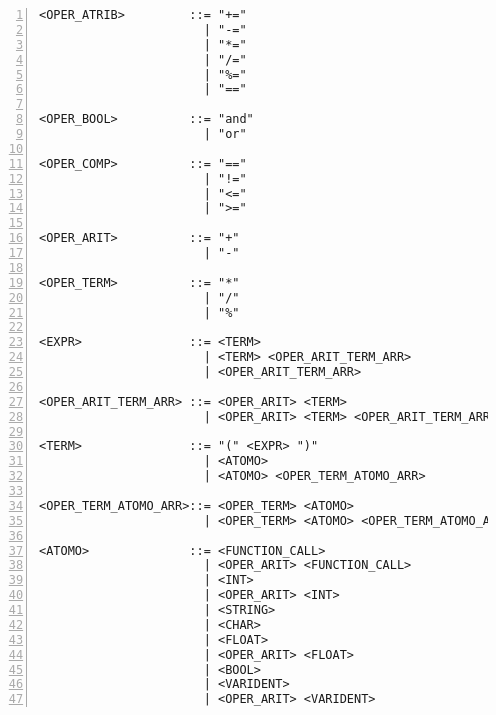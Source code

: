 \begin{lstlisting}[frame=single,numbers=left,breaklines=true,mathescape=true>,basicstyle=\ttfamily\scriptsize]
<OPER_ATRIB>         ::= "+=" 
                       | "-=" 
                       | "*=" 
                       | "/=" 
                       | "%=" 
                       | "=="

<OPER_BOOL>          ::= "and" 
                       | "or"

<OPER_COMP>          ::= "==" 
                       | "!=" 
                       | "<=" 
                       | ">="

<OPER_ARIT>          ::= "+" 
                       | "-"

<OPER_TERM>          ::= "*" 
                       | "/" 
                       | "%"

<EXPR>               ::= <TERM> 
                       | <TERM> <OPER_ARIT_TERM_ARR>
                       | <OPER_ARIT_TERM_ARR>

<OPER_ARIT_TERM_ARR> ::= <OPER_ARIT> <TERM>
                       | <OPER_ARIT> <TERM> <OPER_ARIT_TERM_ARR>

<TERM>               ::= "(" <EXPR> ")"
                       | <ATOMO>
                       | <ATOMO> <OPER_TERM_ATOMO_ARR>

<OPER_TERM_ATOMO_ARR>::= <OPER_TERM> <ATOMO>
                       | <OPER_TERM> <ATOMO> <OPER_TERM_ATOMO_ARR>

<ATOMO>              ::= <FUNCTION_CALL>
                       | <OPER_ARIT> <FUNCTION_CALL>
                       | <INT>
                       | <OPER_ARIT> <INT>
                       | <STRING>
                       | <CHAR>
                       | <FLOAT>
                       | <OPER_ARIT> <FLOAT>
                       | <BOOL>
                       | <VARIDENT>
                       | <OPER_ARIT> <VARIDENT>
\end{lstlisting}
